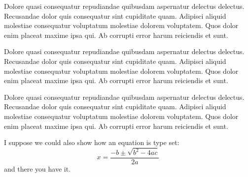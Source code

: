 \documentclass{article}
\begin{document}
\begin{multicols}{2}
{Dolore quasi consequatur repudiandae quibusdam aspernatur delectus delectus. Recusandae dolor quis consequatur sint cupiditate quam. Adipisci aliquid molestiae consequatur voluptatum molestiae dolorem voluptatem. Quos dolor enim placeat maxime ipsa qui. Ab corrupti error harum reiciendis et sunt.

Dolore quasi consequatur repudiandae quibusdam aspernatur delectus delectus. Recusandae dolor quis consequatur sint cupiditate quam. Adipisci aliquid molestiae consequatur voluptatum molestiae dolorem voluptatem. Quos dolor enim placeat maxime ipsa qui. Ab corrupti error harum reiciendis et sunt.

Dolore quasi consequatur repudiandae quibusdam aspernatur delectus delectus. Recusandae dolor quis consequatur sint cupiditate quam. Adipisci aliquid molestiae consequatur voluptatum molestiae dolorem voluptatem. Quos dolor enim placeat maxime ipsa qui. Ab corrupti error harum reiciendis et sunt.

I suppose we could also show how an equation is type set:
\begin{displaymath}
x=\frac{-b\pm\sqrt{b^2-4ac}}{2a}
\end{displaymath}
and there you have it.  \closearticle
}
\end{multicols}
\end{document}
